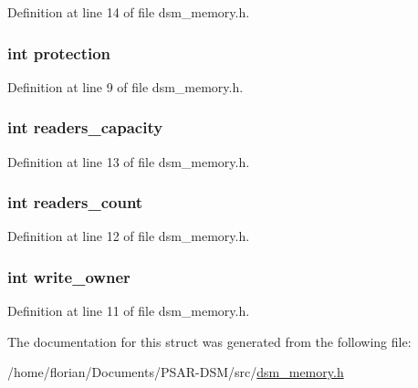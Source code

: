 Definition at line 14 of file dsm\+\_\+memory.\+h.

\subsubsection[{\texorpdfstring{protection}{protection}}]{\setlength{\rightskip}{0pt plus 5cm}int protection}\hypertarget{structdsm__page__s_ae1d884bf54b7e2e34e84ae0d0ae29b54}{}\label{structdsm__page__s_ae1d884bf54b7e2e34e84ae0d0ae29b54}


Definition at line 9 of file dsm\+\_\+memory.\+h.

\subsubsection[{\texorpdfstring{readers\+\_\+capacity}{readers_capacity}}]{\setlength{\rightskip}{0pt plus 5cm}int readers\+\_\+capacity}\hypertarget{structdsm__page__s_a9333d37a32125d59fa18a560432c23b9}{}\label{structdsm__page__s_a9333d37a32125d59fa18a560432c23b9}


Definition at line 13 of file dsm\+\_\+memory.\+h.

\subsubsection[{\texorpdfstring{readers\+\_\+count}{readers_count}}]{\setlength{\rightskip}{0pt plus 5cm}int readers\+\_\+count}\hypertarget{structdsm__page__s_afd6c40de3c12fd6c40c3b32883e5605f}{}\label{structdsm__page__s_afd6c40de3c12fd6c40c3b32883e5605f}


Definition at line 12 of file dsm\+\_\+memory.\+h.

\subsubsection[{\texorpdfstring{write\+\_\+owner}{write_owner}}]{\setlength{\rightskip}{0pt plus 5cm}int write\+\_\+owner}\hypertarget{structdsm__page__s_ae07c60d2fede48e82a22fcfe7e440b15}{}\label{structdsm__page__s_ae07c60d2fede48e82a22fcfe7e440b15}


Definition at line 11 of file dsm\+\_\+memory.\+h.



The documentation for this struct was generated from the following file\+:\begin{DoxyCompactItemize}
\item 
/home/florian/\+Documents/\+P\+S\+A\+R-\/\+D\+S\+M/src/\hyperlink{dsm__memory_8h}{dsm\+\_\+memory.\+h}\end{DoxyCompactItemize}
